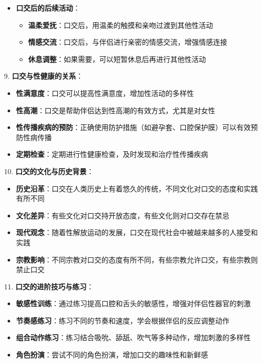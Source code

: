 \documentclass[12pt,UTF8]{ctexbook}
\begin{document}
\begin{itemize}
\begin{itemize}
    \item \textbf{情趣道具}：使用眼罩、手铐等情趣道具增加口交的趣味性
    \end{itemize}
  \item \textbf{口交后的后续活动}：
    \begin{itemize}
    \item \textbf{温柔爱抚}：口交后，用温柔的触摸和亲吻过渡到其他性活动
    \item \textbf{情感交流}：口交后，与伴侣进行亲密的情感交流，增强情感连接
    \item \textbf{休息调整}：如果需要，可以短暂休息后再进行其他性活动
    \end{itemize}
  \end{itemize}

9. \textbf{口交与性健康的关系}：
  \begin{itemize}
  \item \textbf{性满意度}：口交可以提高性满意度，增加性活动的多样性
  \item \textbf{性高潮}：口交是帮助伴侣达到性高潮的有效方式，尤其是对女性
  \item \textbf{性传播疾病的预防}：正确使用防护措施（如避孕套、口腔保护膜）可以有效预防性病传播
  \item \textbf{定期检查}：定期进行性健康检查，及时发现和治疗性传播疾病
  \end{itemize}

10. \textbf{口交的文化与历史背景}：
  \begin{itemize}
  \item \textbf{历史沿革}：口交在人类历史上有着悠久的传统，不同文化对口交的态度和实践有所不同
  \item \textbf{文化差异}：有些文化对口交持开放态度，有些文化则对口交存在禁忌
  \item \textbf{现代观念}：随着性解放运动的发展，口交在现代社会中被越来越多的人接受和实践
  \item \textbf{宗教影响}：不同宗教对口交的态度有所不同，有些宗教允许口交，有些宗教则禁止口交
  \end{itemize}

11. \textbf{口交的进阶技巧与练习}：
    \begin{itemize}
    \item \textbf{敏感性训练}：通过练习提高口腔和舌头的敏感性，增强对伴侣性器官的刺激
    \item \textbf{节奏感练习}：练习不同的节奏和速度，学会根据伴侣的反应调整动作
    \item \textbf{组合动作练习}：练习结合吸吮、舔舐、吹气等多种动作，增加刺激的多样性
    \item \textbf{角色扮演}：尝试不同的角色扮演，增加口交的趣味性和新鲜感
    \end{itemize}
\end{document}
